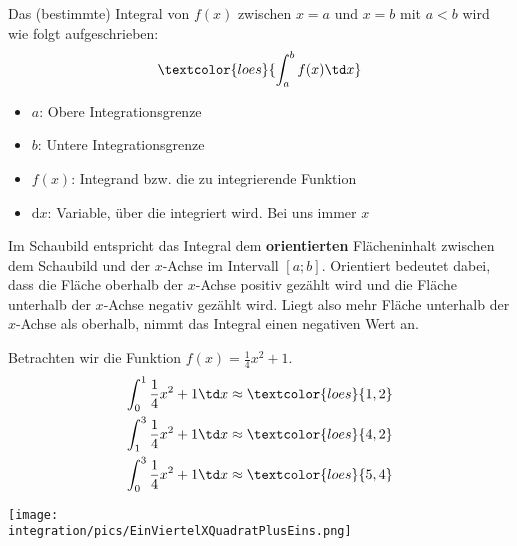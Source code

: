 Das (bestimmte) Integral von \(f(x)\) zwischen \(x=a\) und \(x=b\) mit \(a<b\) wird wie folgt aufgeschrieben:
\[\textcolor{loes}{\int_a^b f(x)\td x}\]
\begin{itemize}
	\item \(a\): \textcolor{loes}{Obere Integrationsgrenze}\\
	\item \(b\): \textcolor{loes}{Untere Integrationsgrenze}\\
	\item \(f(x)\): \textcolor{loes}{Integrand bzw. die zu integrierende Funktion}\\
	\item \(\text{d} x\): \textcolor{loes}{Variable, über die integriert wird. Bei uns immer \(x\)}\\
\end{itemize}
\begin{tcolorbox}
	\textcolor{loestc}{Im Schaubild entspricht das Integral dem \textbf{orientierten} Flächeninhalt zwischen dem Schaubild und der \(x\)-Achse im Intervall \([a;b]\). Orientiert bedeutet dabei, dass die Fläche oberhalb der \(x\)-Achse positiv gezählt wird und die Fläche unterhalb der \(x\)-Achse negativ gezählt wird. Liegt also mehr Fläche unterhalb der \(x\)-Achse als oberhalb, nimmt das Integral einen negativen Wert an.}
\end{tcolorbox}
\begin{minipage}{\textwidth}
	\begin{minipage}{.59\textwidth}\raggedright
		Betrachten wir die Funktion \(f(x)=\frac{1}{4}x^2+1\).
		\begin{align*}
			\int_0^1 \frac{1}{4}x^2+1\td x&\approx\textcolor{loes}{1,2}\\		
			\int_1^3 \frac{1}{4}x^2+1\td x&\approx\textcolor{loes}{4,2}\\
			\int_0^3 \frac{1}{4}x^2+1\td x&\approx\textcolor{loes}{5,4}
		\end{align*}		
	\end{minipage}
	\begin{minipage}{.36\textwidth}
		\texttt{[image: \\integration/pics/EinViertelXQuadratPlusEins.png]}
	\end{minipage}
\end{minipage}
\vspace{1cm}\\
